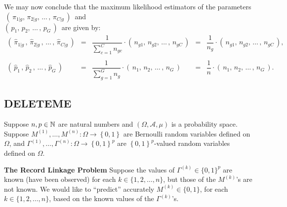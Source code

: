 We may now conclude that the maximum likelihood estimators of the parameters
\,$\left(\,\pi_{1\vert g},\,\pi_{2\vert g}, \,\ldots\,, \,\pi_{C\vert g}\,\right)$\,
and\\
$\left(\,p_{1},\,p_{2}, \,\ldots\,, \,p_{G}\,\right)$\,
are given by:
\begin{equation*}
	\begin{array}{ccccc}
	\left(\,\widehat{\pi}_{1\vert g}\,,\,\widehat{\pi}_{2\vert g}\,, \,\ldots\,, \,\widehat{\pi}_{C\vert g}\,\right)
	& = & \dfrac{1}{\sum^{C}_{c=1}n_{gc}} \cdot \left(\,n_{g1},\,n_{g2}, \,\ldots\,,\, n_{gC}\,\right)
	& = & \dfrac{1}{n_{g}} \cdot \left(\,n_{g1},\,n_{g2}, \,\ldots\,,\, n_{gC}\,\right),
	\\ \\
	\left(\,\widehat{p}_{1}\,,\,\widehat{p}_{2}\,, \,\ldots\,, \,\widehat{p}_{G}\,\right)
	& = & \dfrac{1}{\sum^{G}_{g=1}n_{g}} \cdot \left(\,n_{1},\,n_{2}, \,\ldots\,,\, n_{G}\,\right)
	& = & \dfrac{1}{n} \cdot \left(\,n_{1},\,n_{2}, \,\ldots\,,\, n_{G}\,\right).
	\end{array}
\end{equation*}


\subsection{DELETEME}

Suppose $n, p \in \mathbb{N}$ are natural numbers and
$\left(\Omega,\mathcal{A},\mu\right)$ is a probability space.
Suppose $M^{(1)}, \ldots, M^{(n)} : \Omega \longrightarrow \left\{0,1\right\}$
are Bernoulli random variables defined on $\Omega$, and
$\Gamma^{(1)}, \ldots, \Gamma^{(n)} : \Omega \longrightarrow \left\{0,1\right\}^{p}$
are $\left\{0,1\right\}^{p}$-valued random variables defined on $\Omega$.

\vskip 0.5cm
\noindent
\textbf{The Record Linkage Problem}
\vskip 0.05cm
\noindent
Suppose the values of $\Gamma^{(k)} \in \{0,1\}^{p}$ are known (have been observed) for each $k \in \{1,2,\ldots,n\}$,
but those of the $M^{(k)}$'s are not known.
We would like to ``predict'' accurately $M^{(k)} \in \{0,1\}$, for each $k \in \{1,2,\ldots,n\}$,
based on the known values of the $\Gamma^{(k)}$'s.

